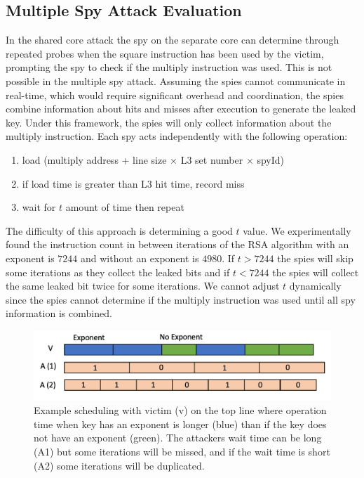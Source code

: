 \documentclass[12pt]{article}
\begin{document}
\subsection{Multiple Spy Attack Evaluation}

In the shared core attack the spy on the separate core can determine through repeated probes when the square instruction has been used by the victim, prompting the spy to check if the multiply instruction was used.
This is not possible in the multiple spy attack.
Assuming the spies cannot communicate in real-time, which would require significant overhead and coordination, the spies combine information about hits and misses after execution to generate the leaked key.
Under this framework, the spies will only collect information about the multiply instruction.
Each spy acts independently with the following operation: 
\begin{enumerate} 
\item load (multiply address + line size $\times$ L3 set number  $\times$ spyId)
\item if load time is greater than L3 hit time, record miss
\item wait for $t$ amount of time then repeat
\end{enumerate}

The difficulty of this approach is determining a good $t$ value. 
We experimentally found the instruction count in between iterations of the RSA algorithm with an exponent is $7244$ and without an exponent is $4980$.
If $t > 7244$ the spies will skip some iterations as they collect the leaked bits and if $t <7244$ the spies will collect the same leaked bit twice for some iterations.
We cannot adjust $t$ dynamically since the spies cannot determine if the multiply instruction was used until all spy information is combined. 

\begin{figure}[h]
\centering
\includegraphics[scale=0.5]{../presentation/multi-order.png}
\caption{Example scheduling with victim (v) on the top line where operation time when key has an exponent is longer (blue) than if the key does not have an exponent (green). The attackers wait time can be long (A1) but some iterations will be missed, and if the wait time is short (A2) some iterations will be duplicated.}
\label{fig:mo}
\end{figure}
\end{document}
